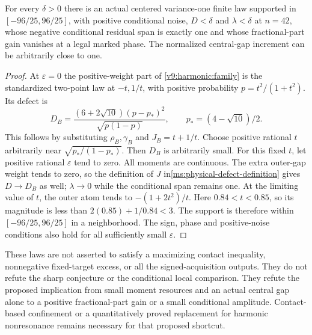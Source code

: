 \begin{corollary}\label{v9:harmonic:arbitrary}
For every $\delta>0$ there is an actual centered variance-one finite law
supported in $[-96/25,96/25]$, with positive conditional noise,
$D<\delta$ and $\lambda<\delta$ at $n=42$, whose negative conditional
residual span is exactly one and whose fractional-part gain vanishes
at a legal marked phase. The normalized central-gap increment can be
arbitrarily close to one.
\end{corollary}
\begin{proof}
At $\varepsilon=0$ the positive-weight part of \eqref{v9:harmonic:family} is
the standardized two-point law at $-t,1/t$, with positive probability
$p=t^2/(1+t^2)$. Its defect is
\[
 D_B=\frac{(6+2\sqrt{10})(p-p_*)^2}{\sqrt{p(1-p)}},
 \qquad p_*=(4-\sqrt{10})/2.
\]
This follows by substituting $\rho_B,\gamma_B$ and $J_B=t+1/t$.
Choose positive rational $t$ arbitrarily near
$\sqrt{p_*/(1-p_*)}$. Then $D_B$ is arbitrarily small.
For this fixed $t$, let positive rational $\varepsilon$ tend to zero.
All moments are continuous. The extra outer-gap weight tends to zero,
so the definition of $J$ in\eqref{ms:physical-defect-definition} gives $D\to D_B$ as well;
$\lambda\to0$ while the conditional span remains one.
At the limiting value of $t$, the outer atom tends to
$-(1+2t^2)/t$. Here $0.84<t<0.85$, so its magnitude is less than
$2(0.85)+1/0.84<3$. The support is therefore within
$[-96/25,96/25]$ in a neighborhood. The sign, phase and positive-noise
conditions also hold for all sufficiently small $\varepsilon$.
\end{proof}

These laws are not asserted to satisfy a maximizing contact inequality,
nonnegative fixed-target excess, or all the signed-acquisition outputs.
They do not refute the sharp conjecture or the conditional local comparison.
They refute the proposed implication from small moment resources and an
actual central gap alone to a positive fractional-part gain or a small
conditional amplitude. Contact-based confinement or a quantitatively
proved replacement for harmonic nonresonance remains necessary for that proposed shortcut.

